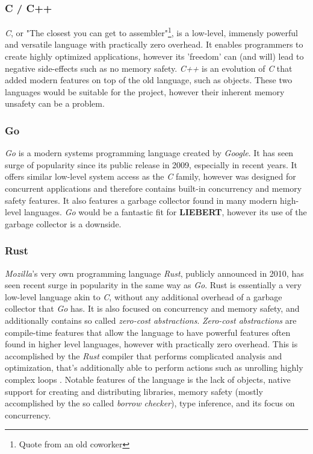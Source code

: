 \documentclass[12pt,a4paper,table]{article}
\begin{document}
            \subsubsection{C / C++}
                \textit{C}, or "The closest you can get to assembler"\footnote{Quote from an old coworker}, is a low-level, immensly powerful and versatile language with practically zero overhead. It enables programmers to create highly optimized applications, however its 'freedom' can (and will) lead to negative side-effects such as no memory safety. \textit{C++} is an evolution of \textit{C} that added modern features on top of the old language, such as objects. These two languages would be suitable for the project, however their inherent memory unsafety can be a problem.

            \subsubsection{Go}
                \textit{Go} is a modern systems programming language created by \textit{Google}. It has seen surge of popularity since its public release in 2009, especially in recent years. It offers similar low-level system access as the \textit{C} family, however was designed for concurrent applications and therefore contains built-in concurrency and memory safety features. It also features a garbage collector found in many modern high-level languages. \textit{Go} would be a fantastic fit for \textbf{LIEBERT}, however its use of the garbage collector is a downside.

            \subsubsection{Rust}
                \textit{Mozilla}'s very own programming language \textit{Rust}, publicly announced in 2010, has seen recent surge in popularity in the same way as \textit{Go}. Rust is essentially a very low-level language akin to \textit{C}, without any additional overhead of a garbage collector that \textit{Go} has. It is also focused on concurrency and memory safety, and additionally contains so called \textit{zero-cost abstractions}. \textit{Zero-cost abstractions} are compile-time features that allow the language to have powerful features often found in higher level languages, however with practically zero overhead. This is accomplished by the \textit{Rust} compiler that performs complicated analysis and optimization, that's additionally able to perform actions such as unrolling highly complex loops \citep{asseldonk}. Notable features of the language is the lack of objects, native support for creating and distributing libraries, memory safety (mostly accomplished by the so called \textit{borrow checker}), type inference, and its focus on concurrency.
\end{document}
